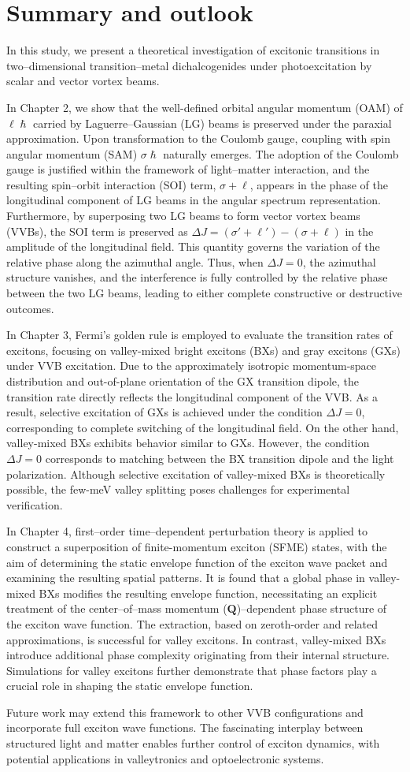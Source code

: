 \chapter{Summary and outlook}
\label{ch:conclusion}
In this study, we present a theoretical investigation of excitonic transitions in two--dimensional transition--metal dichalcogenides under photoexcitation by scalar and vector vortex beams.

In Chapter 2, we show that the well-defined orbital angular momentum (OAM) of $\ell \hslash$ carried by Laguerre--Gaussian (LG) beams is preserved under the paraxial approximation. Upon transformation to the Coulomb gauge, coupling with spin angular momentum (SAM) $\sigma \hslash$ naturally emerges. The adoption of the Coulomb gauge is justified within the framework of light--matter interaction, and the resulting spin--orbit interaction (SOI) term, $\sigma+\ell$, appears in the phase of the longitudinal component of LG beams in the angular spectrum representation. Furthermore, by superposing two LG beams to form vector vortex beams (VVBs), the SOI term is preserved as $\Delta J=(\sigma'+\ell')-(\sigma+\ell)$ in the amplitude of the longitudinal field. This quantity governs the variation of the relative phase along the azimuthal angle. Thus, when $\Delta J=0$, the azimuthal structure vanishes, and the interference is fully controlled by the relative phase between the two LG beams, leading to either complete constructive or destructive outcomes.

In Chapter 3, Fermi's golden rule is employed to evaluate the transition rates of excitons, focusing on valley-mixed bright excitons (BXs) and gray excitons (GXs) under VVB excitation. Due to the approximately isotropic momentum-space distribution and out-of-plane orientation of the GX transition dipole, the transition rate directly reflects the longitudinal component of the VVB. As a result, selective excitation of GXs is achieved under the condition $\Delta J=0$, corresponding to complete switching of the longitudinal field. On the other hand, valley-mixed BXs exhibits behavior similar to GXs. However, the condition $\Delta J=0$ corresponds to matching between the BX transition dipole and the light polarization. Although selective excitation of valley-mixed BXs is theoretically possible, the few-meV valley splitting poses challenges for experimental verification.

In Chapter 4, first--order time--dependent perturbation theory is applied to construct a superposition of finite-momentum exciton (SFME) states, with the aim of determining the static envelope function of the exciton wave packet and examining the resulting spatial patterns. It is found that a global phase in valley-mixed BXs modifies the resulting envelope function, necessitating an explicit treatment of the center--of--mass momentum ($\boldsymbol{Q}$)--dependent phase structure of the exciton wave function. The extraction, based on zeroth-order and related approximations, is successful for valley excitons. In contrast, valley-mixed BXs introduce additional phase complexity originating from their internal structure. Simulations for valley excitons further demonstrate that phase factors play a crucial role in shaping the static envelope function.

Future work may extend this framework to other VVB configurations and incorporate full exciton wave functions. The fascinating interplay between structured light and matter enables further control of exciton dynamics, with potential applications in valleytronics and optoelectronic systems.
